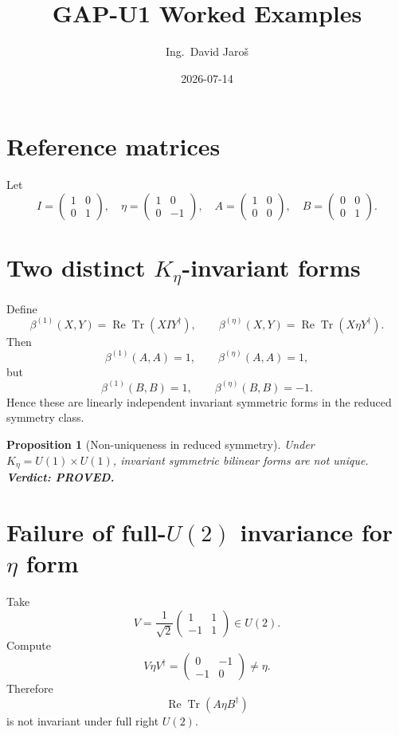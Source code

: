 \documentclass[12pt,a4paper]{article}
\title{GAP-U1 Worked Examples}
\author{Ing.\ David Jaroš}
\date{2026-07-14}
\newtheorem{proposition}{Proposition}[section]
\begin{document}
\maketitle
\fi

\section{Reference matrices}
Let
\[
I=\begin{pmatrix}1&0\\0&1\end{pmatrix},\quad
\eta=\begin{pmatrix}1&0\\0&-1\end{pmatrix},\quad
A=\begin{pmatrix}1&0\\0&0\end{pmatrix},\quad
B=\begin{pmatrix}0&0\\0&1\end{pmatrix}.
\]

\section{Two distinct $K_\eta$-invariant forms}
Define
\[
\beta^{(1)}(X,Y)=\operatorname{Re}\operatorname{Tr}(XIY^\dagger),
\qquad
\beta^{(\eta)}(X,Y)=\operatorname{Re}\operatorname{Tr}(X\eta Y^\dagger).
\]
Then
\[
\beta^{(1)}(A,A)=1,\qquad
\beta^{(\eta)}(A,A)=1,
\]
but
\[
\beta^{(1)}(B,B)=1,\qquad
\beta^{(\eta)}(B,B)=-1.
\]
Hence these are linearly independent invariant symmetric forms in the reduced symmetry class.

\begin{proposition}[Non-uniqueness in reduced symmetry]
Under $K_\eta=U(1)\times U(1)$, invariant symmetric bilinear forms are not unique.
\textbf{Verdict: PROVED.}
\end{proposition}

\section{Failure of full-$U(2)$ invariance for $\eta$ form}
Take
\[
V=\frac1{\sqrt2}\begin{pmatrix}1&1\\-1&1\end{pmatrix}\in U(2).
\]
Compute
\[
V\eta V^\dagger
=\begin{pmatrix}0&-1\\-1&0\end{pmatrix}
\neq \eta.
\]
Therefore
\[
\operatorname{Re}\operatorname{Tr}(A\eta B^\dagger)
\]
is not invariant under full right $U(2)$.
\end{document}
